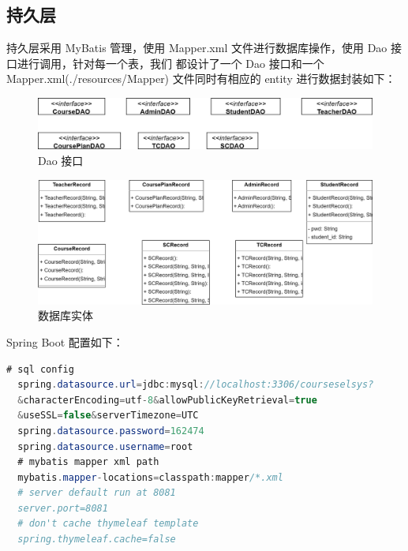 \documentclass[12pt, a4paper]{article}
\begin{document}
\subsection{持久层}
持久层采用 MyBatis 管理，使用 Mapper.xml 文件进行数据库操作，使用 Dao 接口进行调用，针对每一个表，我们
都设计了一个 Dao 接口和一个 Mapper.xml(./resources/Mapper) 文件同时有相应的 entity 进行数据封装如下：
\begin{figure}[H]
  \centering
  \includegraphics[width = 0.8 \textwidth]{MapperInterface.png}
  \caption{Dao 接口}
\end{figure}
\begin{figure}[H]
  \centering
  \includegraphics[width = 0.9 \textwidth]{entity.png}
  \caption{数据库实体}
\end{figure}

Spring Boot 配置如下：
\begin{lstlisting}[language = Java]
  # sql config
  spring.datasource.url=jdbc:mysql://localhost:3306/courseselsys?
  &characterEncoding=utf-8&allowPublicKeyRetrieval=true
  &useSSL=false&serverTimezone=UTC
  spring.datasource.password=162474
  spring.datasource.username=root
  # mybatis mapper xml path
  mybatis.mapper-locations=classpath:mapper/*.xml
  # server default run at 8081
  server.port=8081
  # don't cache thymeleaf template
  spring.thymeleaf.cache=false
\end{lstlisting}
\end{document}
